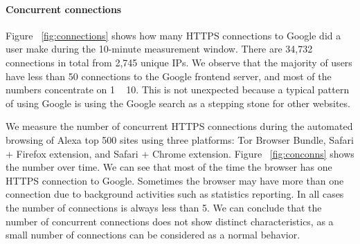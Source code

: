 \documentclass[conference]{IEEEtran}
\begin{document}
\paragraph{Concurrent connections}
Figure ~\ref{fig:connections} shows how many HTTPS connections to Google did a user make 
during the 10-minute measurement window.
There are 34,732 connections in total from 2,745 unique IPs. We observe that the majority of users have less than 
50 connections to the Google frontend server, and most of the numbers concentrate on 1 ~ 10. This is not unexpected
because a typical pattern of using Google is using the Google search as a stepping stone for other websites.

We measure the number of concurrent HTTPS connections during the automated browsing of Alexa
top 500 sites using three platforms: Tor Browser Bundle, Safari + Firefox extension, and Safari + Chrome extension.
Figure ~\ref{fig:conconns} shows the number over time. We can see that most of the time
the browser has one HTTPS connection to Google. Sometimes the browser may have more than one connection
due to background activities such as statistics reporting. In all cases the number of connections is always 
less than 5. We can conclude that the number of concurrent connections does not show distinct characteristics, as 
a small number of connections can be considered as a normal behavior.
\end{document}
